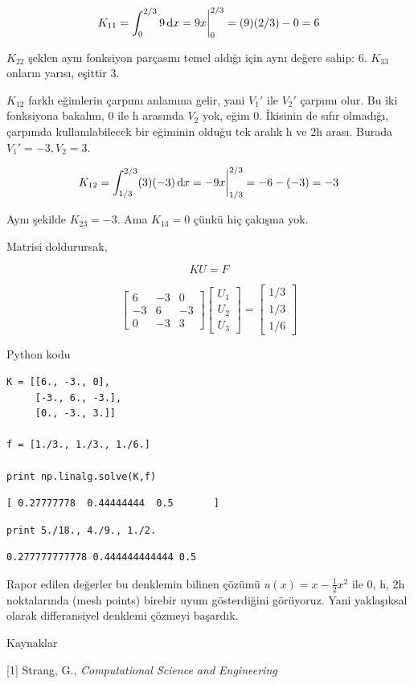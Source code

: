 \documentclass[12pt,fleqn]{article}\usepackage{../../common}
\begin{document}
$$ K_{11} = \int_0^{2/3} 9 \,\mathrm{d} x = 9x \bigg|_0^{2/3} = (9)(2/3) - 0 = 6 $$

$K_{22}$ şeklen aynı fonksiyon parçasını temel aldığı için aynı değere
sahip: 6. $K_{33}$ onların yarısı, eşittir 3.

$K_{12}$ farklı eğimlerin çarpımı anlamına gelir, yani $V_1'$ ile
$V_2'$ çarpımı olur. Bu iki fonksiyona bakalım, 0 ile h arasında $V_2$
yok, eğim 0. İkisinin de sıfır olmadığı, çarpımda kullanılabilecek bir
eğiminin olduğu tek aralık h ve 2h arası. Burada $V_1' = -3, V_2 = 3$.

$$
K_{12} = \int_{1/3}^{2/3} (3)(-3) \,\mathrm{d} x
= -9x \bigg|_{1/3}^{2/3} = -6 - (-3) = -3
$$

Aynı şekilde $K_{23} = -3$. Ama $K_{13} = 0$ çünkü hiç çakışma yok.

Matrisi doldurursak, 

$$
KU = F
$$

$$ 
\left[\begin{array}{ccc}
    6 & -3 & 0 \\
    -3 & 6 & -3 \\
    0 & -3 & 3     
\end{array}\right]
\left[\begin{array}{c}
    U_1 \\
    U_2 \\
    U_3
\end{array}\right]
=
\left[\begin{array}{c}
    1/3 \\
    1/3 \\
    1/6
\end{array}\right]
$$

Python kodu 

\begin{verbatim}
K = [[6., -3., 0],
     [-3., 6., -3.],
     [0., -3., 3.]]

f = [1./3., 1./3., 1./6.]

print np.linalg.solve(K,f)
\end{verbatim}

\begin{verbatim}
[ 0.27777778  0.44444444  0.5       ]
\end{verbatim}

\begin{verbatim}
print 5./18., 4./9., 1./2.
\end{verbatim}

\begin{verbatim}
0.277777777778 0.444444444444 0.5
\end{verbatim}

Rapor edilen değerler bu denklemin bilinen çözümü $u(x) = x - \frac{1}{2}x^2$ 
ile 0, h, 2h noktalarında (mesh points) birebir uyum gösterdiğini
görüyoruz.  Yani yaklaşıksal olarak differansiyel denklemi çözmeyi 
başardık.

Kaynaklar

[1] Strang, G., {\em Computational Science and Engineering}
\end{document}

